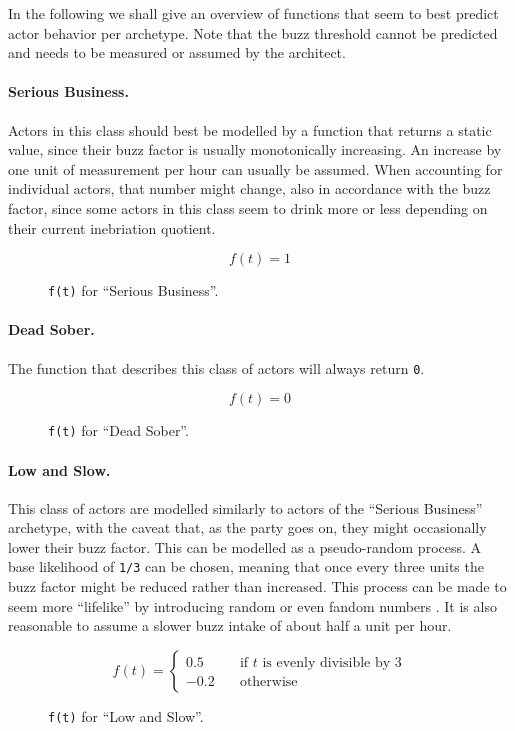 \documentclass[twocolumn]{article}
\begin{document}
In the following we shall give an overview of functions that seem to best
predict actor behavior per archetype. Note that the buzz threshold cannot be
predicted and needs to be measured or assumed by the architect.

\paragraph{Serious Business.} Actors in this class should best be modelled by a
function that returns a static value, since their buzz factor is usually
monotonically increasing. An increase by one unit of measurement per hour can
usually be assumed. When accounting for individual actors, that number might
change, also in accordance with the buzz factor, since some actors in this class
seem to drink more or less depending on their current inebriation quotient.

\begin{figure}[H]
\[ f(t) = 1 \]
\caption{\texttt{f(t)} for “Serious Business”.}
\end{figure}

\paragraph{Dead Sober.} The function that describes this class of actors will
always return \texttt{0}.

\begin{figure}[H]
\[ f(t) = 0 \]
\caption{\texttt{f(t)} for “Dead Sober”.}
\end{figure}

\paragraph{Low and Slow.} This class of actors are modelled similarly to actors
of the “Serious Business” archetype, with the caveat that, as the party goes on,
they might occasionally lower their buzz factor. This can be modelled as a
pseudo-random process. A base likelihood of \texttt{1/3} can be chosen, meaning
that once every three units the buzz factor might be reduced rather than
increased. This process can be made to seem more “lifelike” by introducing
random or even fandom numbers \cite{fandom}. It is also reasonable to assume
a slower buzz intake of about half a unit per hour.

\begin{figure}[H]
\[ f(t) =
  \begin{cases}
    0.5       & \quad \text{if } t \text{ is evenly divisible by 3}\\
    -0.2      & \quad \text{otherwise}
  \end{cases}
\]
\caption{\texttt{f(t)} for “Low and Slow”.}
\end{figure}
\end{document}
